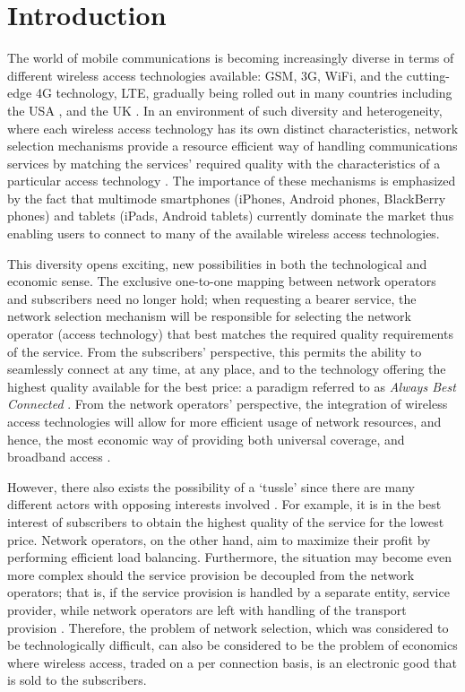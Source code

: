 \chapter{Introduction} %
\label{cha:introduction}

\minitoc
\vspace{10mm}

The world of mobile communications is becoming increasingly diverse in terms of different wireless access technologies available: GSM, 3G, WiFi, and the cutting-edge 4G technology, LTE, gradually being rolled out in many countries including the USA \cite{VerizonLTEUSA}, and the UK \cite{BBCLTEUK}. In an environment of such diversity and heterogeneity, where each wireless access technology has its own distinct characteristics, network selection mechanisms provide a resource efficient way of handling communications services by matching the services' required quality with the characteristics of a particular access technology \cite{HossainBeaubrun09}. The importance of these mechanisms is emphasized by the fact that multimode smartphones (iPhones, Android phones, BlackBerry phones) and tablets (iPads, Android tablets) currently dominate the market thus enabling users to connect to many of the available wireless access technologies.

This diversity opens exciting, new possibilities in both the technological and economic sense. The exclusive one-to-one mapping between network operators and subscribers need no longer hold; when requesting a bearer service, the network selection mechanism will be responsible for selecting the network operator (access technology) that best matches the required quality requirements of the service. From the subscribers' perspective, this permits the ability to seamlessly connect at any time, at any place, and to the technology offering the highest quality available for the best price: a paradigm referred to as \emph{Always Best Connected} \cite{ABC03}. From the network operators' perspective, the integration of wireless access technologies will allow for more efficient usage of network resources, and hence, the most economic way of providing both universal coverage, and broadband access \cite{HossainBeaubrun09}.

However, there also exists the possibility of a `tussle' since there are many different actors with opposing interests involved \cite{Clark02}. For example, it is in the best interest of subscribers to obtain the highest quality of the service for the lowest price. Network operators, on the other hand, aim to maximize their profit by performing efficient load balancing. Furthermore, the situation may become even more complex should the service provision be decoupled from the network operators; that is, if the service provision is handled by a separate entity, service provider, while network operators are left with handling of the transport provision \cite{DMBushTussle09}. Therefore, the problem of network selection, which was considered to be technologically difficult, can also be considered to be the problem of economics where wireless access, traded on a per connection basis, is an electronic good that is sold to the subscribers.

